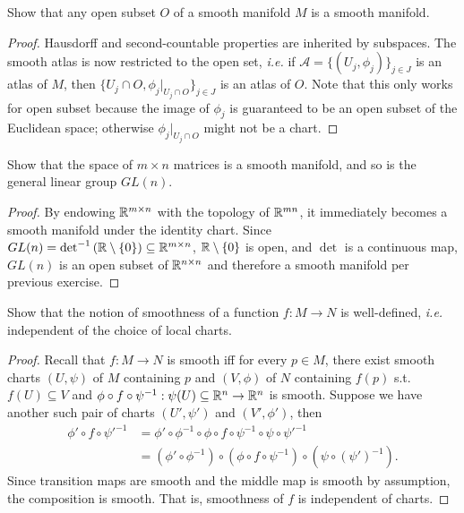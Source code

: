 \documentclass[12pt]{article}
\begin{document}
\begin{problem}[4.3]
Show that any open subset $ O$ of a smooth manifold $ M$ is a smooth manifold.
\end{problem}
\begin{proof}
Hausdorff and second-countable properties are inherited by subspaces. The smooth atlas is now restricted to the open set, \emph{i.e.} if $ \mathcal{ A} = \{(U_j, \phi_j)\}_{j \in J} $ is an atlas of $ M$, then  $ \{U_j \cap O, \phi_j|_{U_j \cap O}\}_{j \in J} $ is an atlas of $ O$. Note that this only works for open subset because the image of $ \phi_j$ is guaranteed to be an open subset of the Euclidean space; otherwise $ \phi_j|_{U_j \cap O}$ might not be a chart.
\end{proof}
\begin{problem}[4.4]
Show that the space of $ m \times n$ matrices is a smooth manifold, and so is the general linear group $ GL(n)$.
\end{problem}
\begin{proof}
By endowing $ \mathbb{R}^{m \times n}$ with the topology of $ \mathbb{R}^{mn}$, it immediately becomes a smooth manifold under the identity chart. Since $ GL(n) = \det^{-1}\left(\mathbb{R}\setminus \{0\} \right) \subseteq \mathbb{R}^{m\times n} $, $ \mathbb{R} \setminus \{0\} $ is open, and $ \det $ is a continuous map, $ GL(n)$ is an open subset of  $ \mathbb{R}^{n\times n}$ and therefore a smooth manifold per previous exercise.
\end{proof}

\begin{problem}[4.6]
Show that the notion of smoothness of a function $ f: M \to N$ is well-defined, \emph{i.e.} independent of the choice of local charts.
\end{problem}
\begin{proof}
Recall that $ f:M \to N$ is smooth iff for every $ p \in M$, there exist smooth charts $ (U,\psi)$ of $ M$ containing $ p$ and $ (V,\phi)$ of $ N$ containing $ f(p)$ s.t.\ $ f(U) \subseteq V$ and $ \phi \circ f \circ \psi ^{-1}: \psi(U) \subseteq \mathbb{R}^{n} \to \mathbb{R}^{n}$ is smooth. Suppose we have another such pair of charts $ (U',\psi')$ and $ (V',\phi')$, then 
\begin{align*}
	\phi' \circ f \circ \psi' ^{-1} &= \phi' \circ \phi ^{-1} \circ \phi \circ f \circ \psi ^{-1} \circ \psi \circ  \psi'^{-1} \\
	&= (\phi' \circ \phi ^{-1}) \circ (\phi \circ f \circ \psi^{-1}) \circ (\psi \circ  (\psi')^{-1})  .
\end{align*}
Since transition maps are smooth and the middle map is smooth by assumption, the composition is smooth. That is, smoothness of $ f$ is independent of charts.
\end{proof}
\end{document}
